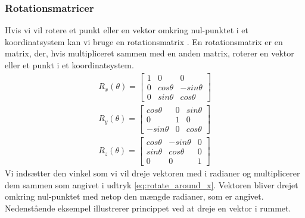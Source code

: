 \subsubsection{Rotationsmatricer}
\label{sec:rot_matricer}
Hvis vi vil rotere et punkt eller en vektor omkring nul-punktet i et koordinatsystem kan vi bruge en rotationsmatrix \cite{rotationsmatricer}.
En rotationsmatrix er en matrix, der, hvis multipliceret sammen med en anden matrix, roterer en vektor eller et punkt i et koordinatsystem.
\begin{align} 
  R_x(\theta) = 
  \begin{bmatrix}
  \label{eq:rotate_around_x}
    1 & 0 & 0\\ 
    0 & cos \theta & - sin \theta\\ 
    0 & sin \theta & cos \theta
  \end{bmatrix}\\
    R_y(\theta) =
  \begin{bmatrix}
    cos \theta  & 0 & sin \theta\\ 
    0           & 1 & 0\\ 
    -sin \theta & 0 & cos \theta
  \end{bmatrix}\\
    R_z(\theta) = 
  \begin{bmatrix}
    cos \theta & - sin \theta & 0\\ 
    sin \theta & cos \theta & 0\\
    0 & 0 & 1
  \end{bmatrix}
\end{align}
Vi indsætter den vinkel som vi vil dreje vektoren med i radianer og multiplicerer dem sammen som angivet i udtryk \ref{eq:rotate_around_x}. Vektoren bliver drejet omkring nul-punktet med netop den mængde radianer, som er angivet.
Nedenstående eksempel illustrerer princippet ved at dreje en vektor i rummet.

